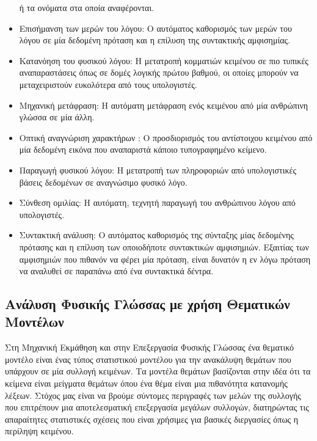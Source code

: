 \begin{itemize}
 ή τα ονόματα στα οποία αναφέρονται.
 \item Επισήμανση των μερών του λόγου: Ο αυτόματος καθορισμός των μερών του λόγου σε μία δεδομένη πρόταση 
 και η επίλυση της συντακτικής αμφισημίας.
 \item Κατανόηση του φυσικού λόγου: Η μετατροπή κομματιών κειμένου σε πιο τυπικές αναπαραστάσεις όπως σε δομές λογικής πρώτου βαθμού, 
 οι οποίες μπορούν να μεταχειριστούν ευκολότερα από τους υπολογιστές.
 \item Μηχανική μετάφραση: Η αυτόματη μετάφραση ενός κειμένου από μία ανθρώπινη γλώσσα σε μία άλλη.
 \item Οπτική αναγνώριση χαρακτήρων {}: 
 Ο προσδιορισμός του αντίστοιχου κειμένου από μία δεδομένη εικόνα που αναπαριστά κάποιο τυπογραφημένο κείμενο.
 \item Παραγωγή φυσικού λόγου: Η μετατροπή των πληροφοριών από υπολογιστικές βάσεις δεδομένων σε αναγνώσιμο φυσικό λόγο.
 \item Σύνθεση ομιλίας: Η αυτόματη, τεχνητή παραγωγή του ανθρώπινου λόγου από υπολογιστές.
 \item Συντακτική ανάλυση: Ο αυτόματος καθορισμός της σύνταξης μίας δεδομένης πρότασης και η επίλυση των οποιοδήποτε συντακτικών αμφισημιών. 
 Εξαιτίας των αμφισημιών που πιθανόν να φέρει μία πρόταση, είναι δυνατόν η εν λόγω πρόταση να αναλυθεί σε παραπάνω από ένα συντακτικά δέντρα.
\end{itemize}

\subsection{Ανάλυση Φυσικής Γλώσσας με χρήση Θεματικών Μοντέλων}

Στη Μηχανική Εκμάθηση και στην Επεξεργασία Φυσικής Γλώσσας ένα θεματικό μοντέλο 
{} είναι ένας τύπος στατιστικού μοντέλου για την ανακάλυψη θεμάτων που
υπάρχουν σε μία συλλογή κειμένων. Τα μοντέλα θεμάτων βασίζονται στην ιδέα ότι τα
κείμενα είναι μείγματα θεμάτων όπου ένα θέμα είναι μια πιθανότητα κατανομής λέξεων.
Στόχος μας είναι να βρούμε σύντομες περιγραφές των μελών της συλλογής 
που επιτρέπουν μια αποτελεσματική επεξεργασία μεγάλων συλλογών, 
διατηρώντας τις απαραίτητες στατιστικές σχέσεις που είναι χρήσιμες
για βασικές διεργασίες όπως η περίληψη κειμένου. \\

